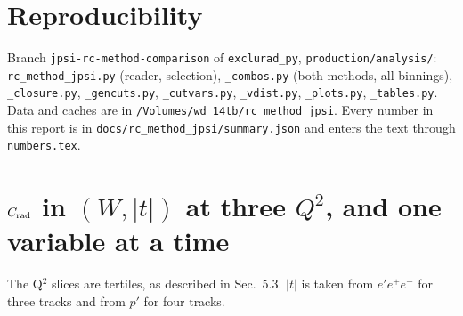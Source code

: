 \documentclass[11pt]{article}
\newcommand{\crad}{C_{\rm rad}}
\begin{document}
\section{Reproducibility}
Branch \texttt{jpsi-rc-method-comparison} of \texttt{exclurad\_py}, \texttt{production/analysis/}:
\texttt{rc\_method\_jpsi.py} (reader, selection), \texttt{\_combos.py} (both methods, all binnings),
\texttt{\_closure.py}, \texttt{\_gencuts.py}, \texttt{\_cutvars.py}, \texttt{\_vdist.py}, \texttt{\_plots.py}, \texttt{\_tables.py}.
Data and caches are in \texttt{/Volumes/wd\_14tb/rc\_method\_jpsi}. Every number in this report is in
\texttt{docs/rc\_method\_jpsi/summary.json} and enters the text through \texttt{numbers.tex}.

\appendix
\section{$\crad$ in $(W,|t|)$ at three $Q^2$, and one variable at a time}
The Q$^2$ slices are tertiles, as described in Sec.~5.3. $|t|$ is taken from $e'e^+e^-$ for three tracks and from $p'$ for four tracks.
\begin{table}[H]\centering\footnotesize

\caption{$\crad(W,|t|)$, $e'e^+e^-$.}
\end{table}
\begin{table}[H]\centering\footnotesize

\caption{$\crad(W,|t|)$, $e'e^+e^-p'$.}
\end{table}
\begin{table}[H]\centering\footnotesize

\caption{$\crad$ in one variable, the other two integrated over the box ($W$ 4.04--4.60, $Q^2$ 0.001--0.143, $|t|$ 0.3--5.0), $e'e^+e^-$.}
\end{table}
\begin{table}[H]\centering\footnotesize

\caption{As above, $e'e^+e^-p'$.}
\end{table}
\end{document}
